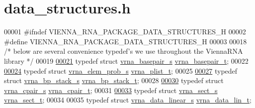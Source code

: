 \hypertarget{data__structures_8h_source}{}\section{data\+\_\+structures.\+h}
\label{data__structures_8h_source}

\begin{DoxyCode}
00001 \textcolor{preprocessor}{#ifndef VIENNA\_RNA\_PACKAGE\_DATA\_STRUCTURES\_H}
00002 \textcolor{preprocessor}{#define VIENNA\_RNA\_PACKAGE\_DATA\_STRUCTURES\_H}
00003 
00018 \textcolor{comment}{/* below are several convenience typedef's we use throughout the ViennaRNA library */}
00019 
\hyperlink{group__data__structures_gac8c5669d3fb813cacf506489689305ce}{00021} \textcolor{keyword}{typedef} \textcolor{keyword}{struct }\hyperlink{group__data__structures_structvrna__basepair__s}{vrna\_basepair\_s} \hyperlink{group__data__structures_structvrna__basepair__s}{vrna\_basepair\_t};
00022 
\hyperlink{group__data__structures_ga5bd6f0d16685b1249b7c3b73049dd5dc}{00024} \textcolor{keyword}{typedef} \textcolor{keyword}{struct }\hyperlink{group__struct__utils_structvrna__elem__prob__s}{vrna\_elem\_prob\_s} \hyperlink{group__struct__utils_structvrna__elem__prob__s}{vrna\_plist\_t};
00025 
\hyperlink{group__data__structures_gaa651bda42e7692f08cb603cd6834b0ee}{00027} \textcolor{keyword}{typedef} \textcolor{keyword}{struct }\hyperlink{group__data__structures_structvrna__bp__stack__s}{vrna\_bp\_stack\_s} \hyperlink{group__data__structures_structvrna__bp__stack__s}{vrna\_bp\_stack\_t};
00028 
\hyperlink{group__data__structures_gae4fc91141cc69c6d8eaf1332cb991ecc}{00030} \textcolor{keyword}{typedef} \textcolor{keyword}{struct }\hyperlink{group__data__structures_structvrna__cpair__s}{vrna\_cpair\_s} \hyperlink{group__data__structures_structvrna__cpair__s}{vrna\_cpair\_t};
00031 
\hyperlink{group__data__structures_gacc9cdae790dac75a7024e7069c0d4400}{00033} \textcolor{keyword}{typedef} \textcolor{keyword}{struct }\hyperlink{group__data__structures_structvrna__sect__s}{vrna\_sect\_s} \hyperlink{group__data__structures_structvrna__sect__s}{vrna\_sect\_t};
00034 
00035 \textcolor{keyword}{typedef} \textcolor{keyword}{struct }\hyperlink{group__data__structures_structvrna__data__linear__s}{vrna\_data\_linear\_s} \hyperlink{group__data__structures_structvrna__data__linear__s}{vrna\_data\_lin\_t};

\end{DoxyCode}
